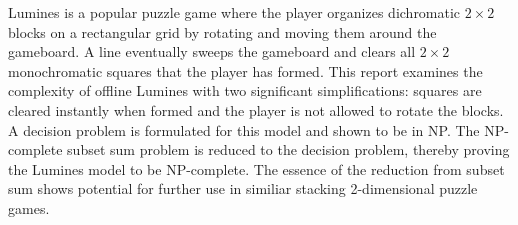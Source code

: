 Lumines is a popular puzzle game where the player organizes dichromatic $2 \times 2$ blocks on a rectangular grid by rotating and moving them around the gameboard. A line eventually sweeps the gameboard and clears all $2 \times 2$ monochromatic squares that the player has formed. This report examines the complexity of offline Lumines with two significant simplifications: squares are cleared instantly when formed and the player is not allowed to rotate the blocks. A decision problem is formulated for this model and shown to be in NP. The NP-complete subset sum problem is reduced to the decision problem, thereby proving the Lumines model to be NP-complete. The essence of the reduction from subset sum shows potential for further use in similiar stacking 2-dimensional puzzle games.
